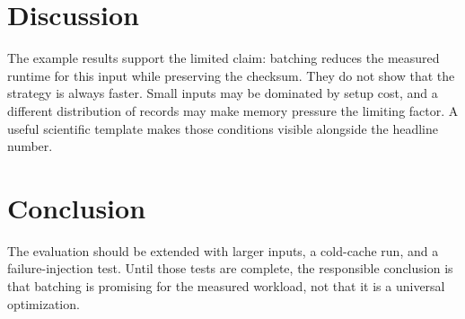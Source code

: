 \documentclass[11pt,a4paper]{article}
\begin{document}
\section{Discussion}
The example results support the limited claim: batching reduces the measured
runtime for this input while preserving the checksum. They do not show that
the strategy is always faster. Small inputs may be dominated by setup cost,
and a different distribution of records may make memory pressure the limiting
factor. A useful scientific template makes those conditions visible alongside
the headline number.

\section{Conclusion}
The evaluation should be extended with larger inputs, a cold-cache run, and a
failure-injection test. Until those tests are complete, the responsible
conclusion is that batching is promising for the measured workload, not that
it is a universal optimization.
\end{document}
